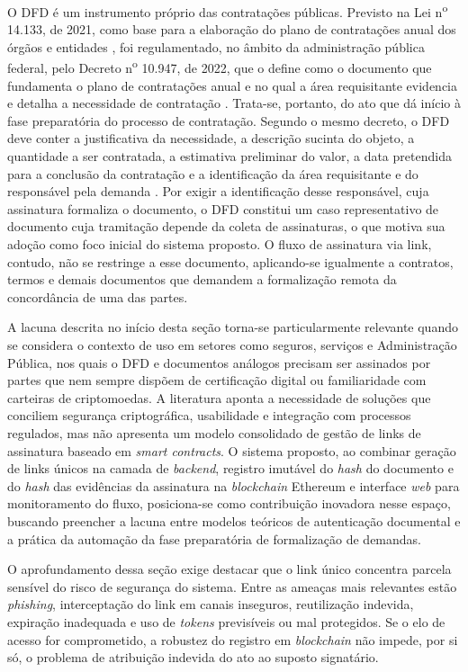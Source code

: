 \documentclass[
    12pt,
    a4paper,
    oneside,
    chapter=TITLE,
    section=TITLE,
    subsection=TITLE,
    subsubsection=TITLE,
    sumario=tradicional,
    english,
    brazil
]{abntex2}
\begin{document}
O DFD é um instrumento próprio das contratações públicas. Previsto na
Lei n\textsuperscript{o} 14.133, de 2021, como base para a elaboração
do plano de contratações anual dos órgãos e entidades
\cite{brasil2021}, foi regulamentado, no âmbito da administração
pública federal, pelo Decreto n\textsuperscript{o} 10.947, de 2022,
que o define como o documento que fundamenta o plano de contratações
anual e no qual a área requisitante evidencia e detalha a necessidade
de contratação \cite{brasil2022}. Trata-se, portanto, do ato que dá
início à fase preparatória do processo de contratação. Segundo o
mesmo decreto, o DFD deve conter a justificativa da necessidade, a
descrição sucinta do objeto, a quantidade a ser contratada, a
estimativa preliminar do valor, a data pretendida para a conclusão da
contratação e a identificação da área requisitante e do responsável
pela demanda \cite{brasil2022}. Por exigir a identificação desse
responsável, cuja assinatura formaliza o documento, o DFD constitui um
caso representativo de documento cuja tramitação depende da coleta de
assinaturas, o que motiva sua adoção como foco inicial do sistema
proposto. O fluxo de assinatura via link, contudo, não se restringe a
esse documento, aplicando-se igualmente a contratos, termos e demais
documentos que demandem a formalização remota da concordância de uma
das partes.

A lacuna descrita no início desta seção torna-se particularmente
relevante quando se considera o
contexto de uso em setores como seguros, serviços e Administração
Pública, nos quais o DFD e documentos análogos precisam ser assinados
por partes que nem sempre dispõem de certificação digital ou
familiaridade com carteiras de criptomoedas. A literatura aponta a
necessidade de soluções que conciliem segurança criptográfica,
usabilidade e integração com processos regulados, mas não apresenta
um modelo consolidado de gestão de links de assinatura baseado em
\emph{smart contracts}. O sistema proposto, ao combinar geração de
links únicos na camada de \emph{backend}, registro imutável do
\emph{hash} do documento e do \emph{hash} das evidências da assinatura
na \emph{blockchain} Ethereum e interface \emph{web} para monitoramento
do fluxo, posiciona-se como contribuição inovadora nesse espaço,
buscando preencher a lacuna entre modelos teóricos de autenticação
documental e a prática da automação da fase preparatória de
formalização de demandas.

O aprofundamento dessa seção exige destacar que o link único
concentra parcela sensível do risco de segurança do sistema. Entre as
ameaças mais relevantes estão \emph{phishing}, interceptação do link
em canais inseguros, reutilização indevida, expiração inadequada e
uso de \emph{tokens} previsíveis ou mal protegidos. Se o elo de
acesso for comprometido, a robustez do registro em \emph{blockchain}
não impede, por si só, o problema de atribuição indevida do ato ao
suposto signatário.
\end{document}
